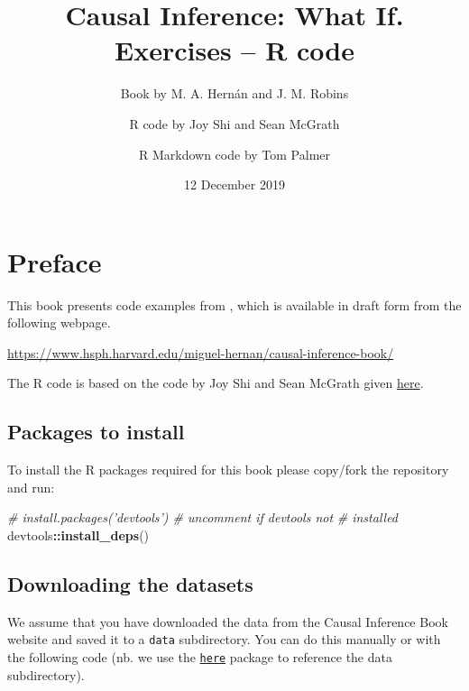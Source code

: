 \documentclass[
  10pt,
]{book}
\title{Causal Inference: What If. Exercises -- R code}
\author{Book by M. A. Hernán and J. M. Robins \and R code by Joy Shi and Sean McGrath \and R Markdown code by Tom Palmer}
\date{12 December 2019}
\newenvironment{Shaded}{\begin{snugshade}}{\end{snugshade}}
\newcommand{\CommentTok}[1]{\textcolor[rgb]{0.56,0.35,0.01}{\textit{#1}}}
\newcommand{\KeywordTok}[1]{\textcolor[rgb]{0.13,0.29,0.53}{\textbf{#1}}}
\newcommand{\NormalTok}[1]{#1}
\newcommand{\OperatorTok}[1]{\textcolor[rgb]{0.81,0.36,0.00}{\textbf{#1}}}
\begin{document}
\maketitle

\thispagestyle{empty}

{
\setcounter{tocdepth}{1}
\tableofcontents
}
\hypertarget{preface}{%
\chapter*{Preface}\label{preface}}

This book presents code examples from \citet{ci-book}, which is available in draft form from the following webpage.

\url{https://www.hsph.harvard.edu/miguel-hernan/causal-inference-book/}

The R code is based on the code by Joy Shi and Sean McGrath given \href{https://cdn1.sph.harvard.edu/wp-content/uploads/sites/1268/1268/20/Rcode_CIpart2.zip}{here}.

\hypertarget{packages-to-install}{%
\section{Packages to install}\label{packages-to-install}}

To install the R packages required for this book please copy/fork the repository and run:

\begin{Shaded}
\begin{Highlighting}[]
\CommentTok{# install.packages('devtools') # uncomment if devtools not}
\CommentTok{# installed}
\NormalTok{devtools}\OperatorTok{::}\KeywordTok{install_deps}\NormalTok{()}
\end{Highlighting}
\end{Shaded}

\hypertarget{downloading-the-datasets}{%
\section{Downloading the datasets}\label{downloading-the-datasets}}

We assume that you have downloaded the data from the Causal Inference Book website and saved it to a \texttt{data} subdirectory. You can do this manually or with the following code (nb. we use the \href{https://here.r-lib.org/}{\texttt{here}} package to reference the data subdirectory).
\end{document}
